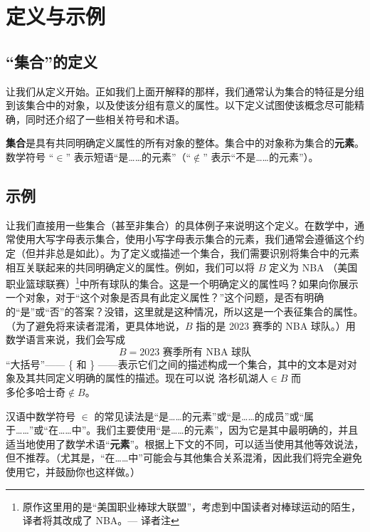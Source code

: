 \section{定义与示例}

\subsection{``集合''的定义}

让我们从定义开始。正如我们上面开解释的那样，我们通常认为集合的特征是分组到该集合中的对象，以及使该分组有意义的属性。以下定义试图使该概念尽可能精确，同时还介绍了一些相关符号和术语。

\begin{definition}
    \textbf{集合}是具有共同明确定义属性的所有对象的整体。集合中的对象称为集合的\textbf{元素}。数学符号 ``$\in$'' 表示短语``是……的元素''（``$\notin$'' 表示``不是……的元素''）。
\end{definition}

\subsection{示例}

让我们直接用一些集合（甚至非集合）的具体例子来说明这个定义。在数学中，通常使用大写字母表示集合，使用小写字母表示集合的元素，我们通常会遵循这个约定（但并非总是如此）。为了定义或描述一个集合，我们需要识别将集合中的元素相互关联起来的共同明确定义的属性。例如，我们可以将 $B$ 定义为 NBA （美国职业篮球联赛）\footnote{原作这里用的是``美国职业棒球大联盟''，考虑到中国读者对棒球运动的陌生，译者将其改成了 NBA。--- 译者注}中所有球队的集合。这是一个明确定义的属性吗？如果向你展示一个对象，对于``这个对象是否具有此定义属性？''这个问题，是否有明确的``是''或``否''的答案？没错，这里就是这种情况，所以这是一个表征集合的属性。（为了避免将来读者混淆，更具体地说，$B$ 指的是 2023 赛季的 NBA 球队。）用数学语言来说，我们会写成
\[B = {\text{2023 赛季所有 NBA 球队}}\]
``大括号''—— \{ 和 \} ——表示它们之间的描述构成一个集合，其中的文本是对对象及其共同定义明确的属性的描述。现在可以说 $\text{洛杉矶湖人} \in B$ 而 $\text{多伦多哈士奇} \notin B$。

汉语中数学符号 $\in$ 的常见读法是``是……的元素''或``是……的成员''或``属于……''或``在……中''。我们主要使用``是……的元素''，因为它是其中最明确的，并且适当地使用了数学术语``\textbf{元素}''。根据上下文的不同，可以适当使用其他等效说法，但不推荐。（尤其是，``在……中''可能会与其他集合关系混淆，因此我们将完全避免使用它，并鼓励你也这样做。）

